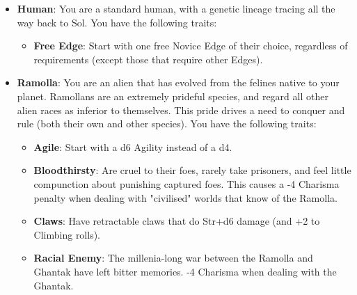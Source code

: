 \documentclass[10pt,twoside]{article}
\begin{document}
\begin{multicols}{2}
\begin{itemize}
\begin{itemize}
    \item \textbf{Natural Weapons}: The Ghoa use their tails, claws and teeth for Str+d6 damage.

    \item \textbf{Ghoan Senses}: Their tongues can "taste" the air, giving them a +2 to Notice checks. (Only applies if the object or individual gives off an odour that the Ghoa can "taste")

    \item \textbf{Prehensile Tail}: Has a flexible and tactile tail that gives one extra non-movement action that incurs no multi-action penalty.

    \item \textbf{Warm Natured}: They are not truely cold-blooded, but they are still uncomfortable in cold environments. Suffer -4 penalty to resist cold environment effects.
\end{itemize}

\item \textbf{Human}: You are a standard human, with a genetic lineage tracing all the way back to Sol. You have the following traits:
\begin{itemize}
    \item \textbf{Free Edge}: Start with one free Novice Edge of their choice, regardless of requirements (except those that require other Edges).
\end{itemize}

\item \textbf{Ramolla}: You are an alien that has evolved from the felines native to your planet. Ramollans are an extremely prideful species, and regard all other alien races as inferior to themselves. This pride drives a need to conquer and rule (both their own and other species). You have the following traits:
\begin{itemize}
    \item \textbf{Agile}: Start with a d6 Agility instead of a d4.

    \item \textbf{Bloodthirsty}: Are cruel to their foes, rarely take prisoners, and feel little compunction about punishing captured foes. This causes a -4 Charisma penalty when dealing with "civilised" worlds that know of the Ramolla.

    \item \textbf{Claws}: Have retractable claws that do Str+d6 damage (and +2 to Climbing rolls).

    \item \textbf{Racial Enemy}: The millenia-long war between the Ramolla and Ghantak have left bitter memories. -4 Charisma when dealing with the Ghantak.


\end{itemize}
\end{itemize}
\end{multicols}
\end{document}

